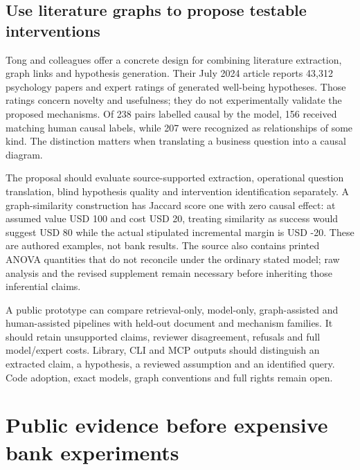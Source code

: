 \hypertarget{use-literature-graphs-to-propose-testable-interventions}{%
\subsection{Use literature graphs to propose testable
interventions}\label{use-literature-graphs-to-propose-testable-interventions}}

Tong and colleagues offer a concrete design for combining literature
extraction, graph links and hypothesis generation. Their July 2024
article reports 43,312 psychology papers and expert ratings of generated
well-being hypotheses. Those ratings concern novelty and usefulness;
they do not experimentally validate the proposed mechanisms. Of 238
pairs labelled causal by the model, 156 received matching human causal
labels, while 207 were recognized as relationships of some kind. The
distinction matters when translating a business question into a causal
diagram. \citep{exec20_hypothesis_generation}

The proposal should evaluate source-supported extraction, operational
question translation, blind hypothesis quality and intervention
identification separately. A graph-similarity construction has Jaccard
score one with zero causal effect: at assumed value USD 100 and cost USD
20, treating similarity as success would suggest USD 80 while the actual
stipulated incremental margin is USD -20. These are authored examples,
not bank results. The source also contains printed ANOVA quantities that
do not reconcile under the ordinary stated model; raw analysis and the
revised supplement remain necessary before inheriting those inferential
claims. \citep{exec20_hypothesis_reference,exec20_hypothesis_generation}

A public prototype can compare retrieval-only, model-only,
graph-assisted and human-assisted pipelines with held-out document and
mechanism families. It should retain unsupported claims, reviewer
disagreement, refusals and full model/expert costs. Library, CLI and MCP
outputs should distinguish an extracted claim, a hypothesis, a reviewed
assumption and an identified query. Code adoption, exact models, graph
conventions and full rights remain open.
\citep{exec20_hypothesis_generation,exec20_hypothesis_reference}

\hypertarget{public-evidence-before-expensive-bank-experiments}{%
\section{Public evidence before expensive bank
experiments}\label{public-evidence-before-expensive-bank-experiments}}

